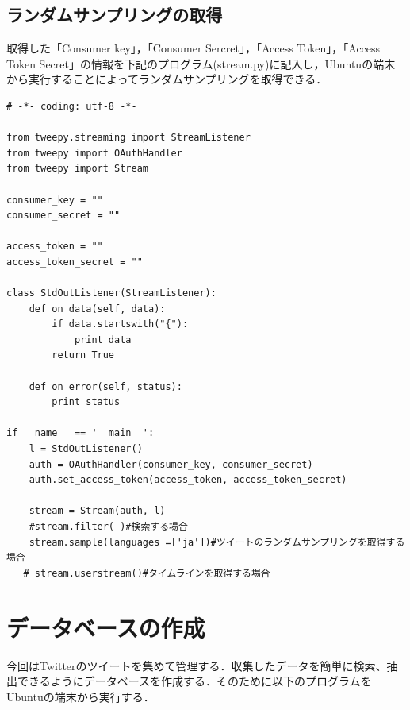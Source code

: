 \clearpage
\subsection{ランダムサンプリングの取得}
取得した「Consumer key」，「Consumer Sercret」，「Access Token」，「Access Token Secret」の情報を下記のプログラム(stream.py)に記入し，Ubuntuの端末から実行することによってランダムサンプリングを取得できる．
\begin{verbatim}
# -*- coding: utf-8 -*-

from tweepy.streaming import StreamListener
from tweepy import OAuthHandler
from tweepy import Stream

consumer_key = ""
consumer_secret = ""

access_token = ""
access_token_secret = ""

class StdOutListener(StreamListener):
    def on_data(self, data):
        if data.startswith("{"):
            print data
        return True
 
    def on_error(self, status):
        print status
 
if __name__ == '__main__':
    l = StdOutListener()
    auth = OAuthHandler(consumer_key, consumer_secret)
    auth.set_access_token(access_token, access_token_secret)
 
    stream = Stream(auth, l)
    #stream.filter( )#検索する場合
    stream.sample(languages =['ja'])#ツイートのランダムサンプリングを取得する場合
   # stream.userstream()#タイムラインを取得する場合
\end{verbatim}


\section{データベースの作成}

今回はTwitterのツイートを集めて管理する．収集したデータを簡単に検索、抽出できるようにデータベースを作成する．そのために以下のプログラムをUbuntuの端末から実行する．





